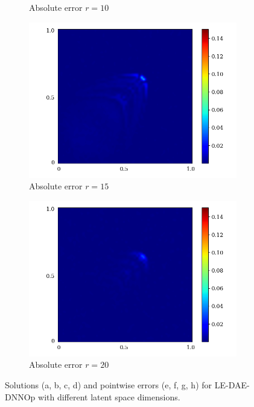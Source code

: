 \begin{figure}[!htb]
\begin{center}
\begin{subfigure}[b]{0.23\textwidth}
\begin{center}
            \end{center}
            \caption{Absolute error $r = 10$}
        \end{subfigure}   
        \begin{subfigure}[b]{0.23\textwidth}
            \begin{center}
                \includegraphics[trim = {0, 0, 3cm, 0}, clip, width=\textwidth]{Pictures/X-rom-LE-DAE-15-abs-err.png}
            \end{center}
            \caption{Absolute error $r = 15$}
        \end{subfigure}    
        \begin{subfigure}[b]{0.23\textwidth}
            \begin{center}
                \includegraphics[trim = {0, 0, 3cm, 0}, clip, width=\textwidth]{Pictures/X-rom-LE-DAE-20-abs-err.png}
            \end{center}
            \caption{Absolute error $r = 20$}
        \end{subfigure}
     \end{center}
     \caption[Solutions and pointwise errors for LE-DAE-DNNOp.]{Solutions (a, b, c, d) and pointwise errors (e, f, g, h) for LE-DAE-DNNOp with different latent space dimensions.}
        \label{fig: ledae-burger}
\end{figure}

